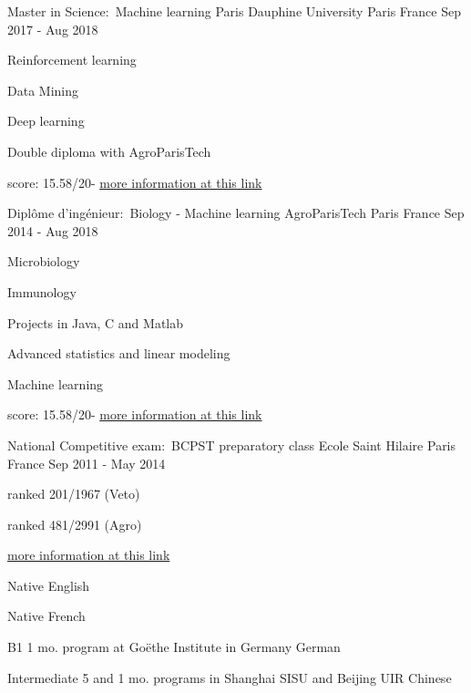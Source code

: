 \documentclass[11pt, a4paper]{awesome-cv}
\begin{document}
\begin{cventries}
\cventry
{Master in Science:~Machine learning}
{Paris Dauphine University}
{Paris France}
{Sep 2017 - Aug 2018}
{
\begin{cvitems}
\item{Reinforcement learning}
\item{Data Mining}
\item{Deep learning}
\item{Double diploma with AgroParisTech}
\item{score: 15.58/20\quad - \quad\href{https://dauphine.psl.eu/formations/masters/informatique/m2-intelligence-artificielle-systemes-donnees}{more information at this link}}
\end{cvitems}
}


\cventry
{Diplôme d'ingénieur:~Biology - Machine learning}
{AgroParisTech}
{Paris France}
{Sep 2014 - Aug 2018}
{
\begin{cvitems}
\item{Microbiology}
\item{Immunology}
\item{Projects in Java, C and Matlab}
\item{Advanced statistics and linear modeling}
\item{Machine learning}
\item{score: 15.58/20\quad - \quad\href{http://www.agroparistech.fr/ufr-info/iodaa/}{more information at this link}}
\end{cvitems}
}


\cventry
{National Competitive exam:~BCPST preparatory class}
{Ecole Saint Hilaire}
{Paris France}
{Sep 2011 - May 2014}
{
\begin{cvitems}
\item{ranked 201/1967 (Veto)}
\item{ranked 481/2991 (Agro)}
\item{\href{https://en.wikipedia.org/wiki/Classe_preparatoire_aux_grandes_ecoles}{more information at this link}}
\end{cvitems}
}
\end{cventries}
\begin{cvhonors}
\cvhonor
{Native}
{}
{}
{English}

\cvhonor
{Native}
{}
{}
{French}

\cvhonor
{B1}
{1 mo. program at Goëthe Institute in Germany}
{}
{German}

\cvhonor
{Intermediate}
{5 and 1 mo. programs in Shanghai SISU and Beijing UIR}
{}
{Chinese}
\end{cvhonors}
\end{document}
